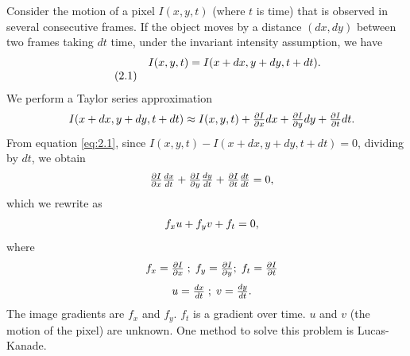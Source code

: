 Consider the motion of a pixel $I(x,y,t)$ (where $t$ is time) that is observed in several consecutive frames. If the object moves by a distance $(dx,dy)$ between two frames taking $dt$ time, under the invariant intensity assumption, we have
\[
\begin{array}{lc}
  {\rm } & {I(x,y,t)} = I(x+dx,y+dy,t+dt). \\ \tag{2.1} \label{eq:2.1}
\end{array}
\]
We perform a Taylor series approximation
\[
\begin{array}{lc}
  {\rm } & {I(x+dx,y+dy,t+dt) \approx I(x,y,t) + \frac{\partial I}{\partial x}dx+\frac{\partial I}{\partial y}d y+\frac{\partial I}{\partial t}dt}.\\ 
\end{array}
\]
From equation \eqref{eq:2.1}, since ${I(x,y,t)} - I(x+dx,y+dy,t+dt) = 0$, dividing by $dt$, we obtain
\[
\begin{array}{lc}
  {\rm } & {\frac{\partial I}{\partial x}\frac{dx}{dt}+\frac{\partial I}{\partial y}\frac{d y}{d t}+\frac{\partial I}{\partial t}\frac{dt}{dt} = 0},\\ 
\end{array}
\]
which we rewrite as
\[
\begin{array}{lc}
  {\rm } & {f_xu + f_yv+ f_t }= 0, \\ 
\end{array}
\]
where
\[
\begin{array}{lc}
  {\rm } & {f_x = \frac{\partial I}{\partial x} \; ; \; f_y = \frac{\partial I}{\partial y} ; \; f_t = \frac{\partial I}{\partial t}}\\ 
\end{array}
\]
\[
\begin{array}{lc}
  {\rm } & {u = \frac{dx}{dt} \; ; \; v = \frac{dy}{dt}.}\\ 
\end{array}
\]
The image gradients are $ f_x $ and $ f_y $. $ f_t $ is a gradient over time. $u$ and $v$ (the motion of the pixel) are unknown. One method to solve this problem is Lucas-Kanade.

